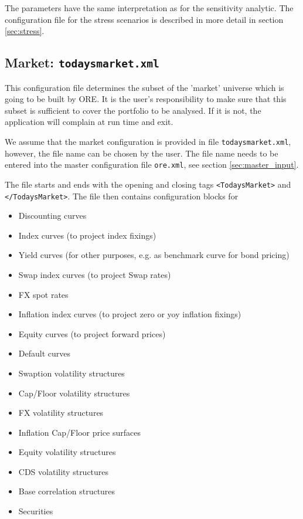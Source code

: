 \documentclass[12pt, a4paper]{article}
\begin{document}
The parameters have the same interpretation as for the sensitivity analytic. The configuration file for the stress
scenarios is described in more detail in section \ref{sec:stress}.

\subsection{Market: {\tt todaysmarket.xml}}\label{sec:market}

This configuration file determines the subset of the 'market' universe which is going to be built by ORE. It is the
user's responsibility to make sure that this subset is sufficient to cover the portfolio to be analysed. If it is not,
the application will complain at run time and exit.

\medskip We assume that the market configuration is provided in file {\tt todaysmarket.xml}, however, the file name can
be chosen by the user. The file name needs to be entered into the master configuration file {\tt ore.xml}, see section
\ref{sec:master_input}.

\medskip 
The file starts and ends with the opening and closing tags {\tt <TodaysMarket>} 
and {\tt </TodaysMarket>}. The file then contains configuration blocks for
\begin{itemize}
\item Discounting curves
\item Index curves (to project index fixings)
\item Yield curves (for other purposes, e.g. as benchmark curve for bond pricing)
\item Swap index curves (to project Swap rates)
\item FX spot rates
\item Inflation index curves (to project zero or yoy inflation fixings)
\item Equity curves (to project forward prices)
\item Default curves
\item Swaption volatility structures
\item Cap/Floor volatility structures
\item FX volatility structures
\item Inflation Cap/Floor price surfaces
\item Equity volatility structures
\item CDS volatility structures
\item Base correlation structures
\item Securities
\end{itemize}
\end{document}
